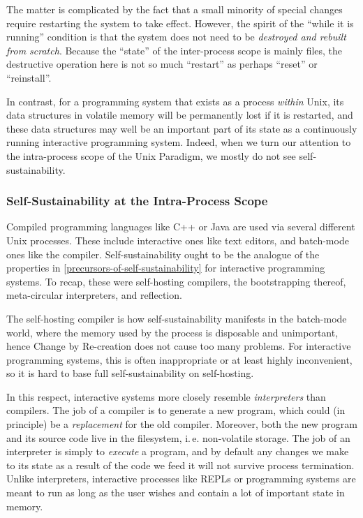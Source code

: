 \documentclass[ twoside,openright,titlepage,numbers=noenddot,headinclude,footinclude,cleardoublepage=empty,abstract=on,
                BCOR=5mm,paper=a4,fontsize=11pt
                ]{scrreprt}
\newcommand{\ie}{i.\,e.}
\theoremstyle{definition}
\begin{document}
The matter is complicated by the fact that a small minority of special
changes require restarting the system to take effect. However, the
spirit of the ``while it is running'' condition is that the system does
not need to be \emph{destroyed and rebuilt from scratch}. Because the
``state'' of the inter-process scope is mainly files, the destructive
operation here is not so much ``restart'' as perhaps ``reset'' or
``reinstall''.

In contrast, for a programming system that exists as a process
\emph{within} Unix, its data structures in volatile memory will be
permanently lost if it is restarted, and these data structures may well
be an important part of its state as a continuously running interactive
programming system. Indeed, when we turn our attention to the
intra-process scope of the Unix Paradigm, we mostly do not see
self-sustainability.

\hypertarget{self-sustainability-at-the-intra-process-scope}{\subsubsection{Self-Sustainability at the Intra-Process
Scope}\label{self-sustainability-at-the-intra-process-scope}}

Compiled programming languages like C++ or Java are used via several
different Unix processes. These include interactive ones like text
editors, and batch-mode ones like the compiler. Self-sustainability
ought to be the analogue of the properties in
\ref{precursors-of-self-sustainability} for interactive programming
systems. To recap, these were self-hosting compilers, the bootstrapping
thereof, meta-circular interpreters, and reflection.

The self-hosting compiler is how self-sustainability manifests in the
batch-mode world, where the memory used by the process is disposable and
unimportant, hence Change by Re-creation does not cause too many
problems. For interactive programming systems, this is often
inappropriate or at least highly inconvenient, so it is hard to base
full self-sustainability on self-hosting.

In this respect, interactive systems more closely resemble
\emph{interpreters} than compilers. The job of a compiler is to generate
a new program, which could (in principle) be a \emph{replacement} for
the old compiler. Moreover, both the new program and its source code
live in the filesystem, \ie{} non-volatile storage. The job of an
interpreter is simply to \emph{execute} a program, and by default any
changes we make to its state as a result of the code we feed it will not
survive process termination. Unlike interpreters, interactive processes
like \acp{REPL} or programming systems are meant to run as long as the
user wishes and contain a lot of important state in memory.
\end{document}
